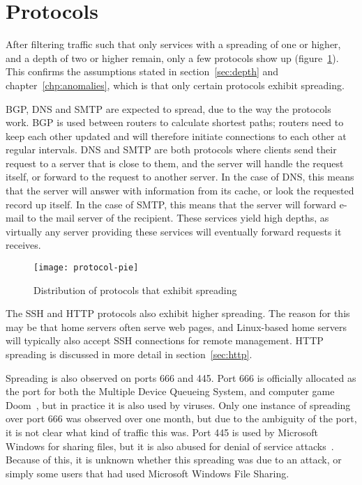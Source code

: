 \section{Protocols}
After filtering traffic such that only \gls{service}s with a spreading of one or higher,
 and a \gls{depth} of two or higher remain, only a few protocols show up (figure~\ref{fig:protocol-pie}).
This confirms the assumptions stated in section~\ref{sec:depth} and chapter~\ref{chp:anomalies},
 which is that only certain protocols exhibit spreading.

\Gls{BGP}, \gls{DNS} and \gls{SMTP} are expected to spread, due to the way the protocols work.
\Gls{BGP} is used between routers to calculate shortest paths; routers need to keep each other updated and will therefore initiate connections to each other at regular intervals.
\gls{DNS} and \gls{SMTP} are both protocols where clients send their request to a server that is close to them,
 and the server will handle the request itself, or forward to the request to another server.
In the case of \gls{DNS}, this means that the server will answer with information from its cache, or look the requested record up itself.
In the case of \gls{SMTP}, this means that the server will forward e-mail to the mail server of the recipient.
These services yield high \gls{depth}s, as virtually any server providing these services will eventually forward requests it receives.


\begin{figure}[h]
	\caption{Distribution of protocols that exhibit spreading}
	\label{fig:protocol-pie}
	\centering
		\texttt{[image: protocol-pie]}
\end{figure}


The \gls{SSH} and \gls{HTTP} protocols also exhibit higher spreading.
The reason for this may be that home servers often serve web pages,
 and Linux-based home servers will typically also accept \gls{SSH} connections for remote management.
HTTP spreading is discussed in more detail in section~\ref{sec:http}.

Spreading is also observed on ports 666 and 445.
Port 666 is officially allocated as the port for both the Multiple Device Queueing System, and computer game Doom~\cite{rfc1700},
 but in practice it is also used by viruses.
Only one instance of spreading over port 666 was observed over one month,
 but due to the ambiguity of the port, it is not clear what kind of traffic this was.
Port 445 is used by Microsoft Windows for sharing files, but it is also abused for denial of service attacks~\cite{lazarevic2003comparative}.
Because of this, it is unknown whether this spreading was due to an attack, or simply some users that had used Microsoft Windows File Sharing.

